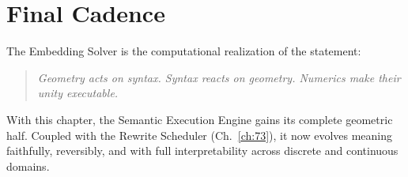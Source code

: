 \section{Final Cadence}

The Embedding Solver is the computational realization of the statement:

\begin{quote}
\emph{Geometry acts on syntax.  
Syntax reacts on geometry.  
Numerics make their unity executable.}
\end{quote}

With this chapter, the Semantic Execution Engine gains its complete geometric half.
Coupled with the Rewrite Scheduler (Ch.~\ref{ch:73}),
it now evolves meaning faithfully, reversibly,  
and with full interpretability across discrete and continuous domains.

